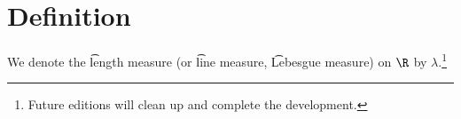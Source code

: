 

\section*{Definition}

We denote the \t{length measure} (or \t{line measure}, \t{Lebesgue measure}) on $\R $ by $\lambda $.\footnote{Future editions will clean up and complete the development.}

\blankpage
